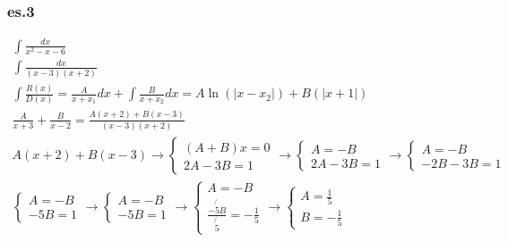 \documentclass{article}
\newcommand{\abs}[1]{\lvert#1\rvert}
\begin{document}
\subsubsection{es.3}
\begin{equation*}
	\begin{matrix}
		\int\frac{dx}{x^2-x-6}\\
		\int\frac{dx}{(x-3)(x+2)}\\
		\int\frac{R(x)}{D(x)}=\frac{A}{x+x_1}dx+\int\frac{B}{x+x_2}dx=A\ln(\abs{x-x_2})+B(\abs{x+1})\\
		\frac{A}{x+3}+\frac{B}{x-2}=\frac{A(x+2)+B(x-3)}{(x-3)(x+2)}\\
		A(x+2)+B(x-3) \to 
		\begin{cases}
			(A+B)x=0\\
			2A-3B=1
		\end{cases}\to \begin{cases}
			A=-B\\
			2A-3B=1
		\end{cases}\to \begin{cases}
			A=-B\\
			-2B-3B=1
		\end{cases}\\
		\begin{cases}
			A=-B\\
			-5B=1
		\end{cases}\to
		\begin{cases}
			A=-B\\
			-5B=1
		\end{cases} \to
		\begin{cases}
			A=-B\\
			\frac{-\not{5}B}{\not{5}}=-\frac{1}{5}
		\end{cases} \to
		\begin{cases}
			A=\frac{1}{5}\\
			B=-\frac{1}{5}
		\end{cases}
	\end{matrix}
\end{equation*}
\end{document}
